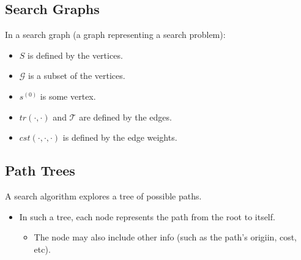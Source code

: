 \subsection{Search Graphs}
\begin{definition}
    In a search graph (a graph representing a search problem):
    \begin{itemize}
        \item $S$ is defined by the vertices.
        \item $\mathcal{G}$ is a subset of the vertices.
        \item $s^{(0)}$ is some vertex.
        \item $tr(\cdot, \cdot)$ and $\mathcal{T}$ are defined by the edges.
        \item $cst(\cdot, \cdot, \cdot)$ is defined by the edge weights.
    \end{itemize}
\end{definition}

\subsection{Path Trees}
\begin{definition}
    A search algorithm explores a tree of possible paths. 
    \begin{itemize}
        \item In such a tree, each node represents the path from the root to itself.
        \begin{itemize}
            \item The node may also include other info (such as the path's origiin, cost, etc).
        \end{itemize}
    \end{itemize}
\end{definition}

